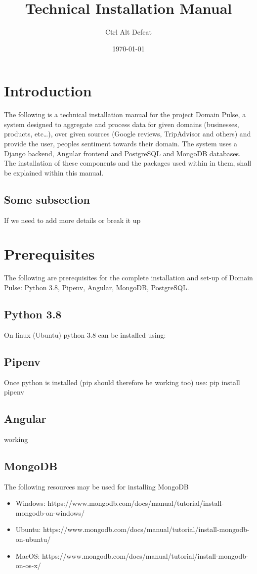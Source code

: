 \documentclass{article}
\title{Technical Installation Manual}
\author{Ctrl Alt Defeat}
\date{\today} %
\begin{document}
\maketitle %


\section{Introduction}
The following is a technical installation manual for the project Domain Pulse, a system designed to aggregate and
process data for given domains (businesses, products, etc…),
over given sources (Google reviews, TripAdvisor and others) and provide the user,
peoples sentiment towards their domain. The system uses a Django backend, Angular frontend and PostgreSQL and MongoDB databases.
The installation of these components and the packages used within in them, shall be explained within this manual.

\subsection{Some subsection}
If we need to add more details or break it up

\section{Prerequisites}
The following are prerequisites for the complete installation and set-up of Domain Pulse: Python 3.8, Pipenv, Angular, MongoDB, PostgreSQL.

\subsection{Python 3.8}
On linux (Ubuntu) python 3.8 can be installed using:

\subsection{Pipenv}
Once python is installed (pip should therefore be working too) use:
pip install pipenv

\subsection{Angular}
working

\subsection{MongoDB}
The following resources may be used for installing MongoDB
\begin{itemize}
    \item Windows: https://www.mongodb.com/docs/manual/tutorial/install-mongodb-on-windows/
    \item Ubuntu: https://www.mongodb.com/docs/manual/tutorial/install-mongodb-on-ubuntu/
    \item MacOS: https://www.mongodb.com/docs/manual/tutorial/install-mongodb-on-os-x/
\end{itemize}
\end{document}
